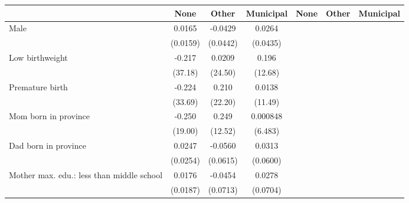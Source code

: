 {
\def\sym#1{\ifmmode^{#1}\else\(^{#1}\)\fi}
\begin{tabular}{l*{6}{c}}
\toprule
                    &\multicolumn{1}{c}{None}&\multicolumn{1}{c}{Other}&\multicolumn{1}{c}{Municipal}&\multicolumn{1}{c}{None}&\multicolumn{1}{c}{Other}&\multicolumn{1}{c}{Municipal}\\
\midrule
Male                &      0.0165         &     -0.0429         &      0.0264         &                     &                     &                     \\
                    &    (0.0159)         &    (0.0442)         &    (0.0435)         &                     &                     &                     \\
\addlinespace
Low birthweight     &      -0.217         &      0.0209         &       0.196         &                     &                     &                     \\
                    &     (37.18)         &     (24.50)         &     (12.68)         &                     &                     &                     \\
\addlinespace
Premature birth     &      -0.224         &       0.210         &      0.0138         &                     &                     &                     \\
                    &     (33.69)         &     (22.20)         &     (11.49)         &                     &                     &                     \\
\addlinespace
Mom born in province&      -0.250         &       0.249         &    0.000848         &                     &                     &                     \\
                    &     (19.00)         &     (12.52)         &     (6.483)         &                     &                     &                     \\
\addlinespace
Dad born in province&      0.0247         &     -0.0560         &      0.0313         &                     &                     &                     \\
                    &    (0.0254)         &    (0.0615)         &    (0.0600)         &                     &                     &                     \\
\addlinespace
Mother max. edu.: less than middle school&      0.0176         &     -0.0454         &      0.0278         &                     &                     &                     \\
                    &    (0.0187)         &    (0.0713)         &    (0.0704)         &                     &                     &                     \\

\end{tabular}}
